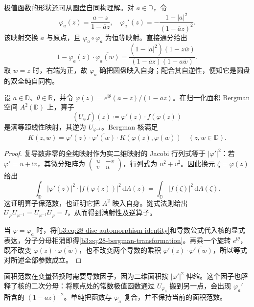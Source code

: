 极值函数的形状还可从圆盘自同构理解。对 \(a\in\mathbb D\)，令
\[
 \varphi_a(z)=\frac{a-z}{1-\overline a z},
 \quad
 \varphi_a'(z)=-\frac{1-|a|^2}{(1-\overline a z)^2}.
\]
该映射交换 \(a\) 与原点，且 \(\varphi_a\circ\varphi_a\) 为恒等映射。直接通分给出
\begin{equation}\label{b3:eq:28-disc-automorphism-identity}
 1-\varphi_a(z)\cdot\overline{\varphi_a(w)}
 =\frac{(1-|a|^2)(1-z\overline w)}
 {(1-\overline a z)(1-a\overline w)}.
\end{equation}
取 \(w=z\) 时，右端为正，故 \(\varphi_a\) 确把圆盘映入自身；配合其自逆性，便知它是圆盘的双全纯自同构。

\begin{proposition}[自同构下的面积范数与核]\label{b3:prop:28-bergman-automorphism}
设 \(a\in\mathbb D\)、\(\theta\in\mathbb R\)，并令 \(\varphi(z)=e^{\mathrm{i}\theta}(a-z)/(1-\overline a z)\)。在归一化面积 Bergman 空间 \(A^2(\mathbb D)\) 上，算子
\[
 (U_\varphi f)(z)\coloneqq\varphi'(z)\cdot f(\varphi(z))
\]
是满等距线性映射，其逆为 \(U_{\varphi^{-1}}\)。Bergman 核满足
\begin{equation}\label{b3:eq:28-bergman-transformation}
 K(z,w)=\varphi'(z)\cdot\overline{\varphi'(w)}
 \cdot K(\varphi(z),\varphi(w))
 \quad(z,w\in\mathbb D).
\end{equation}
\end{proposition}
\begin{proof}
复导数非零的全纯映射作为实二维映射的 Jacobi 行列式等于 \(|\varphi'|^2\)：若 \(\varphi'=u+\mathrm{i}v\)，其微分矩阵为 \(\left(\begin{smallmatrix}u&-v\\v&u\end{smallmatrix}\right)\)，行列式为 \(u^2+v^2\)。因此换元 \(\zeta=\varphi(z)\) 给出
\[
 \int_{\mathbb D}|\varphi'(z)|^2\cdot|f(\varphi(z))|^2\,\mathrm{d}A(z)
 =\int_{\mathbb D}|f(\zeta)|^2\,\mathrm{d}A(\zeta).
\]
这证明算子保范数，也证明它把 \(A^2\) 映入自身。链式法则给出 \(U_\varphi U_{\varphi^{-1}}=U_{\varphi^{-1}}U_\varphi=I\)，从而得到满射性及逆算子。

当 \(\varphi=\varphi_a\) 时，将\eqref{b3:eq:28-disc-automorphism-identity}和导数公式代入核的显式表达，分子分母相消即得\eqref{b3:eq:28-bergman-transformation}。再乘一个旋转 \(e^{\mathrm{i}\theta}\)，既不改变 \(\varphi(z)\cdot\overline{\varphi(w)}\)，也不改变两个导数的乘积 \(\varphi'(z)\cdot\overline{\varphi'(w)}\)，所以等式对所述全部参数成立。
\end{proof}

面积范数在变量替换时需要导数因子，因为二维面积按 \(|\varphi'|^2\) 伸缩。这个因子也解释了核的二次分母：将原点处的常数极值函数通过 \(U_{\varphi_a}\) 搬到另一点，会出现 \(\varphi_a'\) 所含的 \((1-\overline a z)^{-2}\)。单纯把函数与 \(\varphi_a\) 复合，并不保持当前的面积范数。

